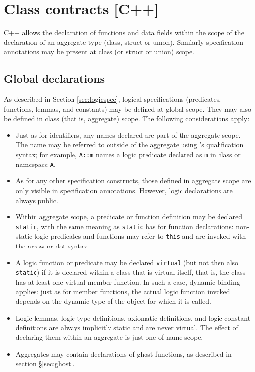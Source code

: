 \section{Class contracts [C++]}
\label{sec:class-contracts}

C++ allows the declaration of functions and data fields within
the scope of the declaration of an aggregate type (class, struct or union). Similarly \NAME specification annotations
may be present at class (or struct or union) scope.

\subsection{Global declarations}

As described in Section \ref{sec:logicspec}, logical specifications (predicates, functions, lemmas, and constants) may be defined at global scope. They may also be defined in class (that is, aggregate) scope. The following considerations apply:
\begin{itemize}
	\item Just as for \lang identifiers, any names 
	declared are part of the aggregate scope. The name may
	be referred to outside of the aggregate using \lang's 
	qualification syntax; for example, \lstinline|A::m| names a 
	logic predicate declared as \lstinline|m| in class
	or namespace \lstinline|A|.
	\item As for any other specification constructs, those defined in aggregate scope are only visible in specification annotations. However, logic declarations are always public.
	\item Within aggregate scope, a predicate or function definition may be
	declared \lstinline|static|, with the same meaning as 
	\lstinline|static| has for \lang function 
	declarations: non-static logic predicates and functions
	may refer to \lstinline|this| and are invoked with the
	\lang arrow or dot syntax.
	
      \item A logic function or predicate may be declared
        \lstinline|virtual| (but not then also \lstinline|static|) if
        it is declared within a class that is virtual itself, that is,
        the class has at least one \lang virtual member function. In such a
        case, dynamic binding applies: just as for \lang member functions, the
        actual logic function invoked depends on the dynamic type of the
        object for which it is called.

	\item Logic lemmas, logic type definitions, axiomatic definitions, and logic constant definitions are always implicitly static and are never virtual. The effect of declaring them within an aggregate is just one of name scope.
	
	\item Aggregates may contain declarations of ghost functions, as described in section \S\ref{sec:ghost}.
\end{itemize}

